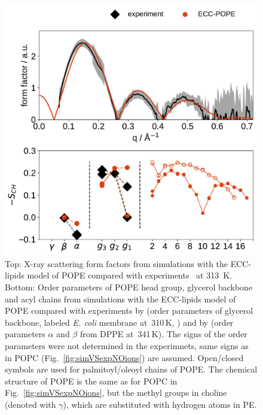 \begin{figure}[tb!] 
  \centering 
  \includegraphics[width=\figwidth]{../img/ecc_pope/Order-parameters_form-factors_exp-ECC-POPE.pdf}
  \caption{\label{simVSexpNOions_POPE} 
    Top: X-ray scattering form factors from simulations with 
    the ECC-lipids model of POPE compared with experiments~\cite{kucerka11} at 313~K. 
    Bottom: Order parameters of POPE head group, glycerol backbone and acyl chains  
    from simulations with the ECC-lipids model of POPE
    compared with experiments by \citet{gally81} (order parameters of glycerol backbone, labeled \emph{E. coli} membrane at~310\,K, ) 
    and by \citet{seelig76, seelig80} (order parameters $\alpha$ and $\beta$ from DPPE at~341\,K).
    The signs of the order parameters were not determined in the experimnets, same signs as in POPC (Fig.~\ref{fig:simVSexpNOions}) are assumed. 
    Open/closed symbols are used for palmitoyl/oleoyl chains of POPE. 
    The chemical structure of POPE is the same as for POPC in Fig.~\ref{fig:simVSexpNOions}, 
    but the methyl groups in choline (denoted with $\gamma$), which are substituted with hydrogen atoms in PE. 
  }  
\end{figure} 


